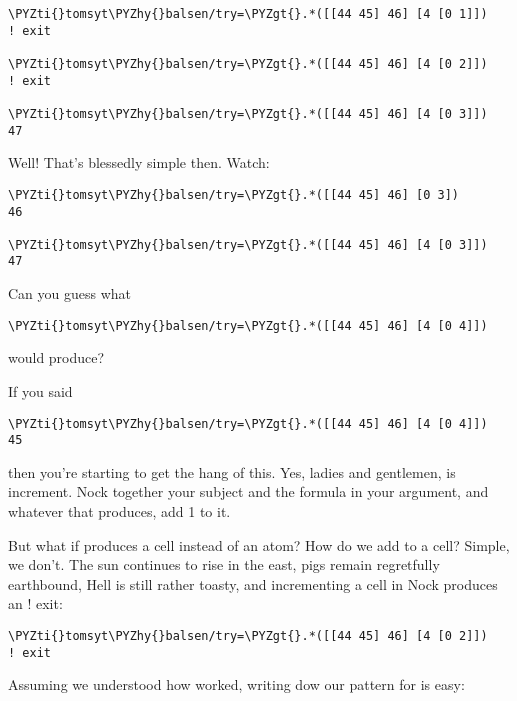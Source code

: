 \begin{framed_shaded}
\begin{Verbatim}[fontsize=\relsize{-2.5},fontseries=b,commandchars=\\\{\}]
\PYZti{}tomsyt\PYZhy{}balsen/try=\PYZgt{}.*([[44 45] 46] [4 [0 1]])
! exit

\PYZti{}tomsyt\PYZhy{}balsen/try=\PYZgt{}.*([[44 45] 46] [4 [0 2]])
! exit

\PYZti{}tomsyt\PYZhy{}balsen/try=\PYZgt{}.*([[44 45] 46] [4 [0 3]])
47
\end{Verbatim}
\end{framed_shaded}
Well! That's blessedly simple then. Watch:
\begin{framed_shaded}
\begin{Verbatim}[fontsize=\relsize{-2.5},fontseries=b,commandchars=\\\{\}]
\PYZti{}tomsyt\PYZhy{}balsen/try=\PYZgt{}.*([[44 45] 46] [0 3])
46

\PYZti{}tomsyt\PYZhy{}balsen/try=\PYZgt{}.*([[44 45] 46] [4 [0 3]])
47
\end{Verbatim}
\end{framed_shaded}
Can you guess what 
\begin{framed_shaded}
\begin{Verbatim}[fontsize=\relsize{-2.5},fontseries=b,commandchars=\\\{\}]
\PYZti{}tomsyt\PYZhy{}balsen/try=\PYZgt{}.*([[44 45] 46] [4 [0 4]])
\end{Verbatim}
\end{framed_shaded}
would produce?

If you said 
\begin{framed_shaded}
\begin{Verbatim}[fontsize=\relsize{-2.5},fontseries=b,commandchars=\\\{\}]
\PYZti{}tomsyt\PYZhy{}balsen/try=\PYZgt{}.*([[44 45] 46] [4 [0 4]])
45
\end{Verbatim}
\end{framed_shaded}
then you're starting to get the hang of this. Yes, ladies and gentlemen,  is increment. Nock together your subject and the formula in your argument,
and whatever that produces, add 1 to it.

But what if  produces a cell instead of an atom? How do we
add  to a cell? Simple, we don't. The sun continues to rise in the east,
pigs remain regretfully earthbound, Hell is still rather toasty, and
incrementing a cell in Nock produces an ! exit:
\begin{framed_shaded}
\begin{Verbatim}[fontsize=\relsize{-2.5},fontseries=b,commandchars=\\\{\}]
\PYZti{}tomsyt\PYZhy{}balsen/try=\PYZgt{}.*([[44 45] 46] [4 [0 2]])
! exit
\end{Verbatim}
\end{framed_shaded}
Assuming we understood how  worked, writing dow our pattern for  is easy:

